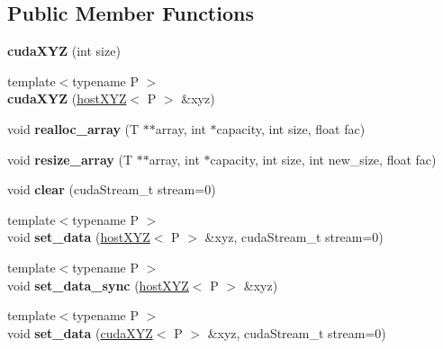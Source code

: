 \subsection*{Public Member Functions}
\begin{DoxyCompactItemize}
\item 
\hypertarget{classcudaXYZ_a96f039e6dbc48700099c8bd46b4ea9cf}{}\label{classcudaXYZ_a96f039e6dbc48700099c8bd46b4ea9cf} 
{\bfseries cuda\+X\+YZ} (int size)
\item 
\hypertarget{classcudaXYZ_ab3983371d2c461fe9bc119a6cc51ea22}{}\label{classcudaXYZ_ab3983371d2c461fe9bc119a6cc51ea22} 
{\footnotesize template$<$typename P $>$ }\\{\bfseries cuda\+X\+YZ} (\hyperlink{classhostXYZ}{host\+X\+YZ}$<$ P $>$ \&xyz)
\item 
\hypertarget{classcudaXYZ_add2c4fc089505705e4b573a65808299a}{}\label{classcudaXYZ_add2c4fc089505705e4b573a65808299a} 
void {\bfseries realloc\+\_\+array} (T $\ast$$\ast$array, int $\ast$capacity, int size, float fac)
\item 
\hypertarget{classcudaXYZ_a3e91946cba1bb829af9b7fcd96752ba8}{}\label{classcudaXYZ_a3e91946cba1bb829af9b7fcd96752ba8} 
void {\bfseries resize\+\_\+array} (T $\ast$$\ast$array, int $\ast$capacity, int size, int new\+\_\+size, float fac)
\item 
\hypertarget{classcudaXYZ_a38e52631433135bb845803a615bbfd4f}{}\label{classcudaXYZ_a38e52631433135bb845803a615bbfd4f} 
void {\bfseries clear} (cuda\+Stream\+\_\+t stream=0)
\item 
\hypertarget{classcudaXYZ_a2494ea82dd6bc3baffe90526a532808f}{}\label{classcudaXYZ_a2494ea82dd6bc3baffe90526a532808f} 
{\footnotesize template$<$typename P $>$ }\\void {\bfseries set\+\_\+data} (\hyperlink{classhostXYZ}{host\+X\+YZ}$<$ P $>$ \&xyz, cuda\+Stream\+\_\+t stream=0)
\item 
\hypertarget{classcudaXYZ_a3eb7753507c67e944083a591e9fcda4c}{}\label{classcudaXYZ_a3eb7753507c67e944083a591e9fcda4c} 
{\footnotesize template$<$typename P $>$ }\\void {\bfseries set\+\_\+data\+\_\+sync} (\hyperlink{classhostXYZ}{host\+X\+YZ}$<$ P $>$ \&xyz)
\item 
\hypertarget{classcudaXYZ_a2d9ba6fa4e058e4a16de4dc45ae1cf99}{}\label{classcudaXYZ_a2d9ba6fa4e058e4a16de4dc45ae1cf99} 
{\footnotesize template$<$typename P $>$ }\\void {\bfseries set\+\_\+data} (\hyperlink{classcudaXYZ}{cuda\+X\+YZ}$<$ P $>$ \&xyz, cuda\+Stream\+\_\+t stream=0)

\end{DoxyCompactItemize}
